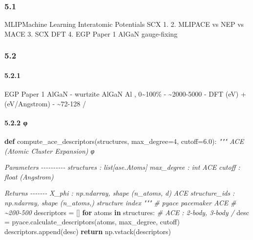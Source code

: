 \documentclass[
  12pt,
]{article}
\newenvironment{Shaded}{}{}
\newcommand{\CommentTok}[1]{\textcolor[rgb]{0.38,0.63,0.69}{\textit{#1}}}
\newcommand{\ControlFlowTok}[1]{\textcolor[rgb]{0.00,0.44,0.13}{\textbf{#1}}}
\newcommand{\DecValTok}[1]{\textcolor[rgb]{0.25,0.63,0.44}{#1}}
\newcommand{\FloatTok}[1]{\textcolor[rgb]{0.25,0.63,0.44}{#1}}
\newcommand{\KeywordTok}[1]{\textcolor[rgb]{0.00,0.44,0.13}{\textbf{#1}}}
\newcommand{\NormalTok}[1]{#1}
\newcommand{\OperatorTok}[1]{\textcolor[rgb]{0.40,0.40,0.40}{#1}}
\begin{document}
\subsubsection{5.1 }\label{ux5b9eux9a8cux76eeux6807-2}

 MLIPMachine Learning Interatomic Potentials
SCX 1.  2.  MLIPACE vs
NEP vs MACE 3. SCX 
DFT  4.  EGP Paper 1  AlGaN gauge-fixing 

\subsubsection{5.2 }\label{ux6570ux636eux96c6-1}

\paragraph{5.2.1 }\label{ux6570ux636eux6765ux6e90}

 EGP Paper 1  AlGaN  - wurtzite AlGaN 
Al , 0\textasciitilde100\% - \textasciitilde2000-5000
 - DFT  (eV) +  (eV/Angstrom) -
\textasciitilde72-128 /

\paragraph{5.2.2 φ
}\label{ux63cfux8ff0ux7b26ux8ba1ux7b97ux3c6-ux6620ux5c04}

\begin{Shaded}
\begin{Highlighting}[]
\KeywordTok{def}\NormalTok{ compute\_ace\_descriptors(structures, max\_degree}\OperatorTok{=}\DecValTok{4}\NormalTok{, cutoff}\OperatorTok{=}\FloatTok{6.0}\NormalTok{):}
    \CommentTok{""" ACE (Atomic Cluster Expansion)  φ }

\CommentTok{    Parameters}
\CommentTok{    {-}{-}{-}{-}{-}{-}{-}{-}{-}{-}}
\CommentTok{    structures : list[ase.Atoms]}
\CommentTok{    max\_degree : int}
\CommentTok{        ACE }
\CommentTok{    cutoff : float}
\CommentTok{         (Angstrom)}

\CommentTok{    Returns}
\CommentTok{    {-}{-}{-}{-}{-}{-}{-}}
\CommentTok{    X\_phi : np.ndarray, shape (n\_atoms, d)}
\CommentTok{         ACE }
\CommentTok{    structure\_ids : np.ndarray, shape (n\_atoms,)}
\CommentTok{         structure index}
\CommentTok{    """}
    \CommentTok{\#  pyace  pacemaker  ACE }
    \CommentTok{\#  \textasciitilde{}200{-}500 }
\NormalTok{    descriptors }\OperatorTok{=}\NormalTok{ []}
    \ControlFlowTok{for}\NormalTok{ atoms }\KeywordTok{in}\NormalTok{ structures:}
        \CommentTok{\# ACE :  2{-}body, 3{-}body /}
\NormalTok{        desc }\OperatorTok{=}\NormalTok{ pyace.calculate\_descriptors(atoms, max\_degree, cutoff)}
\NormalTok{        descriptors.append(desc)}
    \ControlFlowTok{return}\NormalTok{ np.vstack(descriptors)}
\end{Highlighting}
\end{Shaded}
\end{document}
